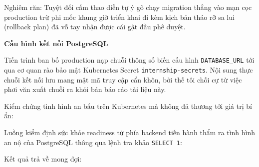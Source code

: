 \begin{Shaded}
\begin{Highlighting}[]
\end{Highlighting}
\end{Shaded}

Nghiêm răn: Tuyệt đối cấm thao diễn tự ý gõ chạy migration thẳng vào mạn
cọc production trừ phi mốc khung giờ triển khai đi kèm kịch bản tháo rỡ
sa lui (rollback plan) đã vỗ tay nhận được cái gật đầu phê duyệt.

\vspace{0.5em}\noindent\textbf{Cấu hình kết nối
PostgreSQL}\par

Tiến trình ban bố production nạp chuỗi thông số biến cấu hình
\texttt{DATABASE\_\allowbreak{}URL} tới qua cơ quan rào bảo mật Kubernetes Secret
\texttt{internship-\allowbreak{}secrets}. Nội sung thực chuỗi kết nối lưu mang mật mã
truy cập cẩn khôn, bởi thế tôi chối cự từ việc phơi văn xuất chuỗi ra
khỏi bản báo cáo tài liệu này.

Kiểm chứng tình hình an bấu trên Kubernetes mà không đả thương tới giá
trị bí ẩn:

\begin{Shaded}
\begin{Highlighting}[]
\end{Highlighting}
\end{Shaded}

Luồng kiểm định sức khỏe readiness từ phía backend tiến hành thẩm ra
tình hình an nộ của PostgreSQL thông qua lệnh tra khảo
\texttt{SELECT\ 1}:

\begin{Shaded}
\begin{Highlighting}[]
 
\end{Highlighting}
\end{Shaded}

Kết quả trả về mong đợi:

